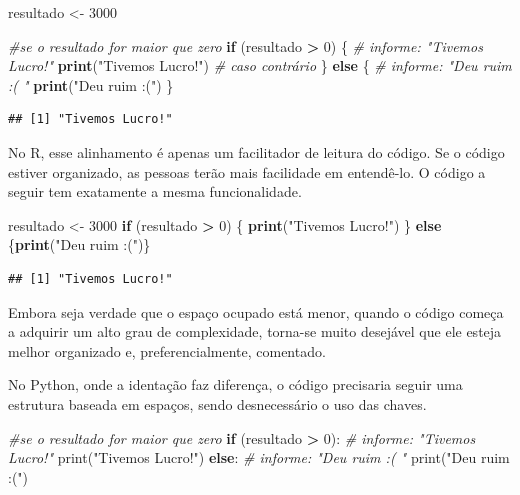 \documentclass[
]{book}
\newenvironment{Shaded}{\begin{snugshade}}{\end{snugshade}}
\newcommand{\BuiltInTok}[1]{#1}
\newcommand{\CommentTok}[1]{\textcolor[rgb]{0.56,0.35,0.01}{\textit{#1}}}
\newcommand{\ControlFlowTok}[1]{\textcolor[rgb]{0.13,0.29,0.53}{\textbf{#1}}}
\newcommand{\DecValTok}[1]{\textcolor[rgb]{0.00,0.00,0.81}{#1}}
\newcommand{\KeywordTok}[1]{\textcolor[rgb]{0.13,0.29,0.53}{\textbf{#1}}}
\newcommand{\NormalTok}[1]{#1}
\newcommand{\OperatorTok}[1]{\textcolor[rgb]{0.81,0.36,0.00}{\textbf{#1}}}
\newcommand{\StringTok}[1]{\textcolor[rgb]{0.31,0.60,0.02}{#1}}
\begin{document}
\begin{Shaded}
\begin{Highlighting}[]
\NormalTok{resultado <-}\StringTok{ }\DecValTok{3000}

\CommentTok{#se o resultado for maior que zero}
\ControlFlowTok{if}\NormalTok{ (resultado }\OperatorTok{>}\StringTok{ }\DecValTok{0}\NormalTok{) \{ }
  \CommentTok{# informe: "Tivemos Lucro!"}
  \KeywordTok{print}\NormalTok{(}\StringTok{"Tivemos Lucro!"}\NormalTok{) }
  \CommentTok{# caso contrário}
\NormalTok{\} }\ControlFlowTok{else}\NormalTok{ \{  }
  \CommentTok{# informe: "Deu ruim :( "}
  \KeywordTok{print}\NormalTok{(}\StringTok{"Deu ruim :("}\NormalTok{) }
\NormalTok{\}}
\end{Highlighting}
\end{Shaded}

\begin{verbatim}
## [1] "Tivemos Lucro!"
\end{verbatim}

No R, esse alinhamento é apenas um facilitador de leitura do código. Se o código estiver organizado, as pessoas terão mais facilidade em entendê-lo. O código a seguir tem exatamente a mesma funcionalidade.

\begin{Shaded}
\begin{Highlighting}[]
\NormalTok{resultado <-}\StringTok{ }\DecValTok{3000}
\ControlFlowTok{if}\NormalTok{ (resultado }\OperatorTok{>}\StringTok{ }\DecValTok{0}\NormalTok{) \{ }\KeywordTok{print}\NormalTok{(}\StringTok{"Tivemos Lucro!"}\NormalTok{) \} }\ControlFlowTok{else}\NormalTok{ \{}\KeywordTok{print}\NormalTok{(}\StringTok{"Deu ruim :("}\NormalTok{)\}}
\end{Highlighting}
\end{Shaded}

\begin{verbatim}
## [1] "Tivemos Lucro!"
\end{verbatim}

Embora seja verdade que o espaço ocupado está menor, quando o código começa a adquirir um alto grau de complexidade, torna-se muito desejável que ele esteja melhor organizado e, preferencialmente, comentado.

No Python, onde a identação faz diferença, o código precisaria seguir uma estrutura baseada em espaços, sendo desnecessário o uso das chaves.

\begin{Shaded}
\begin{Highlighting}[]
\CommentTok{#se o resultado for maior que zero}
\ControlFlowTok{if}\NormalTok{ (resultado }\OperatorTok{>} \DecValTok{0}\NormalTok{):  }
  \CommentTok{# informe: "Tivemos Lucro!"}
  \BuiltInTok{print}\NormalTok{(}\StringTok{"Tivemos Lucro!"}\NormalTok{) }
\ControlFlowTok{else}\NormalTok{:  }
  \CommentTok{# informe: "Deu ruim :( "}
  \BuiltInTok{print}\NormalTok{(}\StringTok{"Deu ruim :("}\NormalTok{) }
\end{Highlighting}
\end{Shaded}
\end{document}

